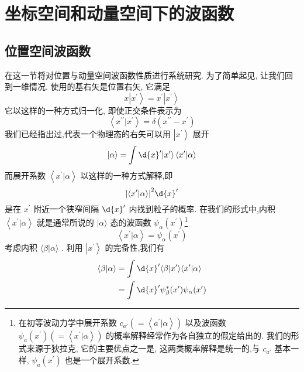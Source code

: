 \section{坐标空间和动量空间下的波函数}
\subsection{位置空间波函数}
在这一节将对位置与动量空间波函数性质进行系统研究. 为了简单起见, 让我们回到一维情况. 使用的基右矢是位置右矢, 它满足
\begin{equation}
	x\left| {x}^{\prime }\right\rangle = {x}^{\prime }\left| {x}^{\prime }\right\rangle
\end{equation}
它以这样的一种方式归一化, 即使正交条件表示为
\begin{equation}
	\left\langle {{x}^{\prime \prime } | {x}^{\prime }}\right\rangle = \delta \left( {{x}^{\prime \prime } - {x}^{\prime }}\right)
\end{equation}
我们已经指出过,代表一个物理态的右矢可以用 $\left| {x}^{\prime }\right\rangle$ 展开
\begin{equation}
	| {\alpha \rangle = \int \d{x}^{\prime }}| {x}^{\prime }\rangle \left\langle {{x}^{\prime } | \alpha }\right\rangle
\end{equation}
而展开系数 $\left\langle {{x}^{\prime } | \alpha }\right\rangle$ 以这样的一种方式解释,即
\begin{equation}
	{\left| \left\langle {x}^{\prime } | \alpha \right\rangle \right| }^{2}\d{x}^{\prime }
\end{equation}
是在 ${x}^{\prime }$ 附近一个狭窄间隔 $\d{x}^{\prime }$ 内找到粒子的概率. 在我们的形式中,内积 $\left\langle {{x}^{\prime } | \alpha }\right\rangle$ 就是通常所说的 $|\alpha \rangle$ 态的波函数 ${\psi }_{\alpha }\left( {x}^{\prime }\right)$\footnote{在初等波动力学中展开系数 ${c}_{a'}\left( { = \left\langle {{a}^{\prime } | \alpha }\right\rangle }\right)$ 以及波函数 ${\psi }_{a}\left( {x}^{\prime }\right) \left( { = \left\langle {{x}^{\prime } | \alpha }\right\rangle }\right)$ 的概率解释经常作为各自独立的假定给出的. 我们的形式来源于狄拉克, 它的主要优点之一是, 这两类概率解释是统一的,与 ${c}_{a'}$ 基本一样, ${\psi }_{a}\left( {x}^{\prime }\right)$ 也是一个展开系数.}
\begin{equation}
	\left\langle {{x}^{\prime } | \alpha }\right\rangle = {\psi }_{\alpha }\left( {x}^{\prime }\right)
\end{equation}
考虑内积 $\langle \beta | \alpha \rangle$ . 利用 $\left| {x}^{\prime }\right\rangle$ 的完备性,我们有
\begin{equation}
	\begin{aligned}
		\langle \beta | \alpha \rangle &= \int \d{x}^{\prime }\langle {\beta | {{x}^{\prime }\rangle \langle {{x}^{\prime } | \alpha }\rangle } }\\
		&= \int \d{x}^{\prime }{\psi }_{\beta }^{ * }( {x}^{\prime }) {\psi }_{\alpha }( {x}^{\prime })
	\end{aligned}
\end{equation}
